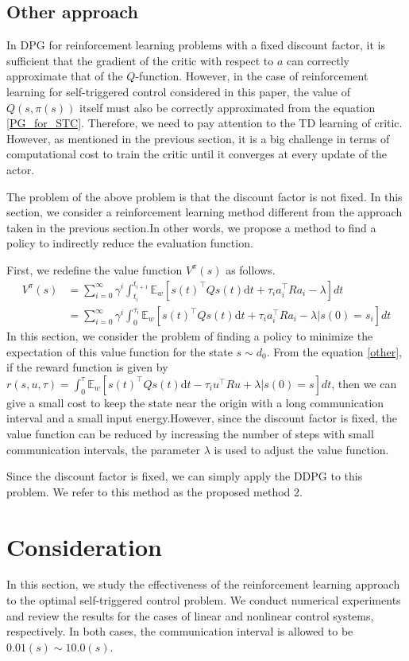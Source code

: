 \documentclass[english, dvipdfmx]{ampmt}             %
\newcommand{\expect}{\mathbb{E}}
\begin{document}
\subsection{Other approach}
In DPG for reinforcement learning problems with a fixed discount factor, it is sufficient that the gradient of the critic with respect to $a$ can correctly approximate that of the $Q$-function. However, in the case of reinforcement learning for self-triggered control considered in this paper, the value of $Q(s,\pi(s))$ itself must also be correctly approximated from the equation \eqref{PG_for_STC}. Therefore, we need to pay attention to the TD learning of critic. However, as mentioned in the previous section, it is a big challenge in terms of computational cost to train the critic until it converges at every update of the actor. \par
The problem of the above problem is that the discount factor is not fixed. In this section, we consider a reinforcement learning method different from the approach taken in the previous section.In other words, we propose a method to find a policy to indirectly reduce the evaluation function.\par 
First, we redefine the value function $V^{\pi}(s)$ as follows.
\begin{align}
	V^{\pi}(s) &= \sum_{i=0}^{\infty}\gamma^i\int_{t_i}^{t_{i+1}}\expect_w[s(t)^{\top}Qs(t)\textrm{d}t + \tau_ia_i^{\top}Ra_i-\lambda] dt \label{other} \nonumber \\
	&=  \sum_{i=0}^{\infty}\gamma^i\int_0^{\tau_i}\expect_w[s(t)^{\top}Qs(t)\textrm{d}t + \tau_ia_i^{\top}Ra_i-\lambda|s(0) = s_i] dt
\end{align}
In this section, we consider the problem of finding a policy to minimize the expectation of this value function for the state $s\sim d_0$. From the equation \eqref{other}, if the reward function is given by $r(s,u,\tau) = \int_0^{\tau}\expect_w[s(t)^{\top}Qs(t)\textrm{d}t - \tau_iu^{\top}Ru+\lambda|s(0) = s] dt$, then we can give a small cost to keep the state near the origin with a long communication interval and a small input energy.However, since the discount factor is fixed, the value function can be reduced by increasing the number of steps with small communication intervals, the parameter $\lambda$ is used to adjust the value function.  \par
Since the discount factor is fixed, we can simply apply the DDPG to this problem. We refer to this method as the proposed method 2.

\section{Consideration}
In this section, we study the effectiveness of the reinforcement learning approach to the optimal self-triggered control problem. We conduct numerical experiments and review the results for the cases of linear and nonlinear control systems, respectively. In both cases, the communication interval is allowed to be $0.01 (s) \sim 10.0 (s)$. 
\end{document}
